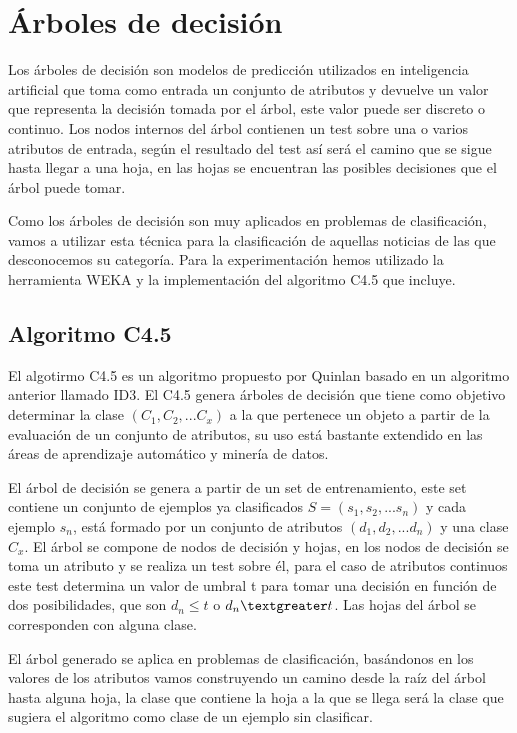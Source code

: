 \section{Árboles de decisión}

Los árboles de decisión son modelos de predicción utilizados en inteligencia artificial que toma como entrada un conjunto de atributos y devuelve un valor que representa la decisión tomada por el árbol, este valor puede ser discreto o continuo. Los nodos internos del árbol contienen un test sobre una o varios atributos de entrada, según el resultado del test así será el camino que se sigue hasta llegar a una hoja, en las hojas se encuentran las posibles decisiones que el árbol puede tomar\cite{B4}.

Como los árboles de decisión son muy aplicados en problemas de clasificación, vamos a utilizar esta técnica para la clasificación de aquellas noticias de las que desconocemos su categoría. Para la experimentación hemos utilizado la herramienta WEKA y la implementación del algoritmo C4.5 que incluye.

\subsection{Algoritmo C4.5}
El algotirmo C4.5 es un algoritmo propuesto por Quinlan basado en un algoritmo anterior llamado ID3. El C4.5 genera árboles de decisión que tiene como objetivo determinar la clase $(C_{1},C_{2},...C_{x})$ a la que pertenece un objeto a partir de la evaluación de un conjunto de atributos, su uso está bastante extendido en las áreas de aprendizaje automático y minería de datos\cite{B1}. 

El árbol de decisión se genera a partir de un set de entrenamiento, este set contiene un conjunto de ejemplos ya clasificados $S = (s_{1},s_{2},...s_{n})$ y cada ejemplo $s_{n}$, está formado por un conjunto de atributos $(d_{1},d_{2},...d_{n})$ y una clase $C_{x}$. El árbol se compone de nodos de decisión y hojas, en los nodos de decisión se toma un atributo y se realiza un test sobre él, para el caso de atributos continuos este test determina un valor de umbral t para tomar una decisión en función de dos posibilidades, que son $d_{n} \leq t$ o $d_{n} \textgreater t$. Las hojas del árbol se corresponden con alguna clase.

El árbol generado se aplica en problemas de clasificación, basándonos en los valores de los atributos vamos construyendo un camino desde la raíz del árbol hasta alguna hoja, la clase que contiene la hoja a la que se llega será la clase que sugiera el algoritmo como clase de un ejemplo sin clasificar.


